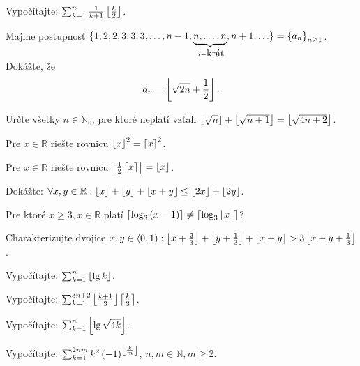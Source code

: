
\pr Vypočítajte: $\sum_{k=1}^n\frac1{k+1}\left\lfloor \frac{k}2 \right\rfloor$.

\pr Majme postupnosť $\{1,2,2,3,3,3,\ldots,n-1,\underbrace{n,\ldots,n}_{n-\hbox{krát}},n+1,\ldots\} = \left\{a_n\right\}_{n\geq1}$. Dokážte, že 
$$a_n = \left\lfloor \sqrt{2n} + \frac12 \right\rfloor.$$

\pr Určte všetky $n\in\mathbb{N}_0$, pre ktoré neplatí vzťah $\left\lfloor \sqrt{n} \right\rfloor + \left\lfloor \sqrt{n+1} \right\rfloor = \left\lfloor \sqrt{4n+2} \right\rfloor$.

\pr Pre $x\in\mathbb{R}$ riešte rovnicu $\left\lfloor x \right\rfloor^2 = \left\lceil x \right\rceil^2$.

\pr Pre $x\in\mathbb{R}$ riešte rovnicu $\left\lceil \frac12\left\lceil x \right\rceil \right\rceil = \left\lfloor x \right\rfloor$.

\pr Dokážte: $\forall x,y \in\mathbb{R}: \left\lfloor x \right\rfloor + \left\lfloor y \right\rfloor + \left\lfloor x + y \right\rfloor \leq \left\lfloor 2x \right\rfloor + \left\lfloor 2y \right\rfloor$.

\pr Pre ktoré $x\geq 3, x\in\mathbb{R}$ platí $\left\lceil \log_3\left(x-1\right) \right\rceil \not= \left\lceil \log_3\left\lfloor x \right\rfloor \right\rceil$?

\pr Charakterizujte dvojice $x,y\in\langle 0, 1): \left\lfloor x + \frac23 \right\rfloor + \left\lfloor y + \frac13 \right\rfloor + \left\lfloor x + y \right\rfloor > 3\left\lfloor x + y +\frac13 \right\rfloor$.

\pr Vypočítajte: $\sum_{k=1}^n\left\lfloor \lg k \right\rfloor$.

\pr Vypočítajte: $\sum_{k=1}^{3n+2}\left\lfloor \frac{k+1}3 \right\rfloor\left\lceil \frac{k}3 \right\rceil$.

\pr Vypočítajte: $\sum_{k=1}^n\left\lfloor \lg \sqrt{4k} \right\rfloor$.

\pr Vypočítajte: $\sum_{k=1}^{2nm}k^2\left(-1\right)^{\left\lfloor \frac{k}m \right\rfloor}$, $n,m\in\mathbb{N}, m\geq2$.

